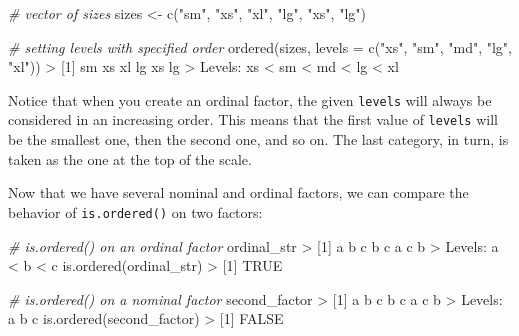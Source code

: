\documentclass[
]{book}
\newenvironment{Shaded}{\begin{snugshade}}{\end{snugshade}}
\newcommand{\AttributeTok}[1]{\textcolor[rgb]{0.77,0.63,0.00}{#1}}
\newcommand{\CommentTok}[1]{\textcolor[rgb]{0.56,0.35,0.01}{\textit{#1}}}
\newcommand{\ConstantTok}[1]{\textcolor[rgb]{0.00,0.00,0.00}{#1}}
\newcommand{\DecValTok}[1]{\textcolor[rgb]{0.00,0.00,0.81}{#1}}
\newcommand{\FunctionTok}[1]{\textcolor[rgb]{0.00,0.00,0.00}{#1}}
\newcommand{\NormalTok}[1]{#1}
\newcommand{\OtherTok}[1]{\textcolor[rgb]{0.56,0.35,0.01}{#1}}
\newcommand{\SpecialCharTok}[1]{\textcolor[rgb]{0.00,0.00,0.00}{#1}}
\newcommand{\StringTok}[1]{\textcolor[rgb]{0.31,0.60,0.02}{#1}}
\begin{document}
\begin{Shaded}
\begin{Highlighting}[]
\CommentTok{\# vector of sizes}
\NormalTok{sizes }\OtherTok{\textless{}{-}} \FunctionTok{c}\NormalTok{(}\StringTok{"sm"}\NormalTok{, }\StringTok{"xs"}\NormalTok{, }\StringTok{"xl"}\NormalTok{, }\StringTok{"lg"}\NormalTok{, }\StringTok{"xs"}\NormalTok{, }\StringTok{"lg"}\NormalTok{)}

\CommentTok{\# setting levels with specified order}
\FunctionTok{ordered}\NormalTok{(sizes, }\AttributeTok{levels =} \FunctionTok{c}\NormalTok{(}\StringTok{"xs"}\NormalTok{, }\StringTok{"sm"}\NormalTok{, }\StringTok{"md"}\NormalTok{, }\StringTok{"lg"}\NormalTok{, }\StringTok{"xl"}\NormalTok{))}
\SpecialCharTok{\textgreater{}}\NormalTok{ [}\DecValTok{1}\NormalTok{] sm xs xl lg xs lg}
\SpecialCharTok{\textgreater{}}\NormalTok{ Levels}\SpecialCharTok{:}\NormalTok{ xs }\SpecialCharTok{\textless{}}\NormalTok{ sm }\SpecialCharTok{\textless{}}\NormalTok{ md }\SpecialCharTok{\textless{}}\NormalTok{ lg }\SpecialCharTok{\textless{}}\NormalTok{ xl}
\end{Highlighting}
\end{Shaded}

Notice that when you create an ordinal factor, the given \texttt{levels} will always
be considered in an increasing order. This means that the first value of \texttt{levels}
will be the smallest one, then the second one, and so on. The last category,
in turn, is taken as the one at the top of the scale.

Now that we have several nominal and ordinal factors, we can compare the
behavior of \texttt{is.ordered()} on two factors:

\begin{Shaded}
\begin{Highlighting}[]
\CommentTok{\# is.ordered() on an ordinal factor}
\NormalTok{ordinal\_str}
\SpecialCharTok{\textgreater{}}\NormalTok{ [}\DecValTok{1}\NormalTok{] a b c b c a c b}
\SpecialCharTok{\textgreater{}}\NormalTok{ Levels}\SpecialCharTok{:}\NormalTok{ a }\SpecialCharTok{\textless{}}\NormalTok{ b }\SpecialCharTok{\textless{}}\NormalTok{ c}
\FunctionTok{is.ordered}\NormalTok{(ordinal\_str)}
\SpecialCharTok{\textgreater{}}\NormalTok{ [}\DecValTok{1}\NormalTok{] }\ConstantTok{TRUE}

\CommentTok{\# is.ordered() on a nominal factor}
\NormalTok{second\_factor}
\SpecialCharTok{\textgreater{}}\NormalTok{ [}\DecValTok{1}\NormalTok{] a b c b c a c b}
\SpecialCharTok{\textgreater{}}\NormalTok{ Levels}\SpecialCharTok{:}\NormalTok{ a b c}
\FunctionTok{is.ordered}\NormalTok{(second\_factor)}
\SpecialCharTok{\textgreater{}}\NormalTok{ [}\DecValTok{1}\NormalTok{] }\ConstantTok{FALSE}
\end{Highlighting}
\end{Shaded}
\end{document}
